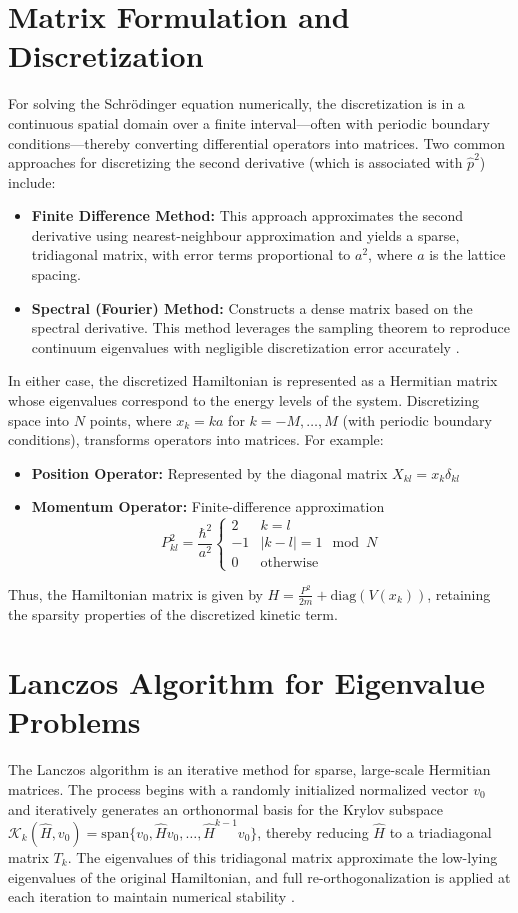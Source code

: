 \documentclass[12pt,a4paper]{report}
\begin{document}
\section{Matrix Formulation and Discretization}
For solving the Schrödinger equation numerically, the discretization is in a continuous spatial domain over a finite interval—often with periodic boundary conditions—thereby converting differential operators into matrices. Two common approaches for discretizing the second derivative (which is associated with $\hat{p}^2$) include:
\begin{itemize}
    \item \textbf{Finite Difference Method:} This approach approximates the second derivative using nearest-neighbour approximation and yields a sparse, tridiagonal matrix, with error terms proportional to $a^2$, where $a$ is the lattice spacing.
    \item \textbf{Spectral (Fourier) Method:} Constructs a dense matrix based on the spectral derivative. This method leverages the sampling theorem to reproduce continuum eigenvalues with negligible discretization error accurately \cite{doi:10.1137/1.9780898719598}.
\end{itemize}
In either case, the discretized Hamiltonian is represented as a Hermitian matrix whose eigenvalues correspond to the energy levels of the system. Discretizing space into $N$ points, where $x_k = ka$ for $k = -M, \ldots ,M$ (with periodic boundary conditions), transforms operators into matrices. For example:
\begin{itemize}
    \item \textbf{Position Operator:} Represented by the diagonal matrix $X_{kl} = x_k\delta_{kl}$
    \item \textbf{Momentum Operator:} Finite-difference approximation
    \begin{equation}
        P^2_{kl} = \frac{\hbar^2}{a^2}\begin{cases} 
        2 & k=l \\
        -1 & |k-l| = 1 \mod N \\
        0 & \text{otherwise}
        \end{cases}
    \end{equation}
\end{itemize}
Thus, the Hamiltonian matrix is given by $H = \frac{P^2}{2m} + \text{diag}(V(x_k))$, retaining the sparsity properties of the discretized kinetic term.

\section{Lanczos Algorithm for Eigenvalue Problems}
The Lanczos algorithm is an iterative method for sparse, large-scale Hermitian matrices. The process begins with a randomly initialized normalized vector $v_0$ and iteratively generates an orthonormal basis for the Krylov subspace $\mathcal{K}_k (\hat{H}, v_0) = \textrm{span}\{v_0, \hat{H} v_0, \ldots, \hat{H}^{k-1} v_0\}$, thereby reducing $\hat{H}$ to a triadiagonal matrix $T_k$. The eigenvalues of this tridiagonal matrix approximate the low-lying eigenvalues of the original Hamiltonian, and full re-orthogonalization is applied at each iteration to maintain numerical stability \cite{Higham2002}.
\end{document}
